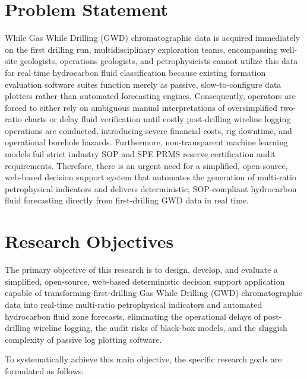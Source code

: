 \section{Problem Statement}

While Gas While Drilling (GWD) chromatographic data is acquired immediately on the first drilling run, multidisciplinary exploration teams, encompassing well-site geologists, operations geologists, and petrophysicists cannot utilize this data for real-time hydrocarbon fluid classification because existing formation evaluation software suites function merely as passive, slow-to-configure data plotters rather than automated forecasting engines. Consequently, operators are forced to either rely on ambiguous manual interpretations of oversimplified two-ratio charts or delay fluid verification until costly post-drilling wireline logging operations are conducted, introducing severe financial costs, rig downtime, and operational borehole hazards. Furthermore, non-transparent machine learning models fail strict industry SOP and SPE PRMS reserve certification audit requirements. Therefore, there is an urgent need for a simplified, open-source, web-based decision support system that automates the generation of multi-ratio petrophysical indicators and delivers deterministic, SOP-compliant hydrocarbon fluid forecasting directly from first-drilling GWD data in real time.

\section{Research Objectives}

The primary objective of this research is to design, develop, and evaluate a simplified, open-source, web-based deterministic decision support application capable of transforming first-drilling Gas While Drilling (GWD) chromatographic data into real-time multi-ratio petrophysical indicators and automated hydrocarbon fluid zone forecasts, eliminating the operational delays of post-drilling wireline logging, the audit risks of black-box models, and the sluggish complexity of passive log plotting software.

To systematically achieve this main objective, the specific research goals are formulated as follows:

